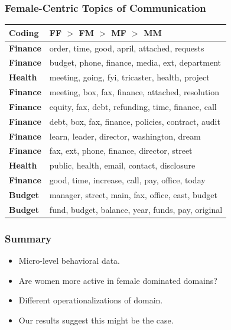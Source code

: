 \documentclass[xcolor={table}, fleqn]{beamer}
\newcommand{\female}[1]{\colorbox{female}{#1}}
\newenvironment{changemargin}[2]{%
  \begin{list}{}{%
    \setlength{\topsep}{0pt}%
    \setlength{\leftmargin}{#1}%
    \setlength{\rightmargin}{#2}%
    \setlength{\listparindent}{\parindent}%
    \setlength{\itemindent}{\parindent}%
    \setlength{\parsep}{\parskip}%
  }%
  \item[]}{\end{list}}
\begin{document}
\begin{frame}\frametitle{Female-Centric Topics of Communication}
	
	
\begin{changemargin}{-1cm}{ -1cm}	
	\centering
		\begin{tabular}{ll}
			\toprule
	Coding & FF $>$ FM $>$ MF $>$ MM\\
	\midrule

	\female{\textbf{Finance}} & order, time, good, april, attached, requests \\ 
	\female{\textbf{Finance}} & budget, phone, finance, media, ext, department
	\\ 
	\textbf{Health} & meeting, going, fyi, tricaster, health, project
	 \\ 
	\female{\textbf{Finance}} & meeting, box, fax, finance, attached, resolution
	\\ 
	\female{\textbf{Finance}} & equity, fax, debt, refunding, time, finance, call
	 \\ 
	\female{\textbf{Finance}} & debt, box, fax, finance, policies, contract, audit
	\\ 
	\female{\textbf{Finance}} & learn, leader, director, washington, dream
	\\ 
	\female{\textbf{Finance}} & fax, ext, phone, finance, director, street
	\\ 
	\textbf{Health} & public, health, email, contact, disclosure

	\\ 
	\female{\textbf{Finance}} & good, time, increase, call, pay, office, today
	
	\\ 
	\female{\textbf{Budget}} & manager, street, main, fax, office, east, budget
	
	\\ 
	\female{\textbf{Budget}} & fund, budget, balance, year, funds, pay, original
	
	\\

			\bottomrule
		\end{tabular}
		\end{changemargin}
\end{frame}






\begin{frame}\frametitle{Summary}
	\LARGE
	\begin{itemize}
		\item Micro-level behavioral data.
		\vspace*{.3in}
		\item Are women more active in female dominated domains?
		\vspace*{.3in}
		\item Different operationalizations of domain.
		\vspace*{.3in}
		\item Our results suggest this might be the case.
	\end{itemize}
\end{frame}
\end{document}
